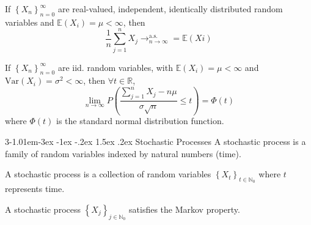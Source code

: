 \documentclass{tufte-handout}
\makeatletter
\renewcommand{\section}{\@startsection{section}%
    {3}{-1.01em}{-3ex \@plus -1ex \@minus -.2ex}%
    {1.5ex \@plus .2ex}
    {\hspace*{-5.5em}\fcolorbox{blue}{blue}{\parbox[c][1.0ex][b]{4em}{\phantom{space}}}
    \normalfont\Large\itshape\color{blue}}}
\makeatother
\begin{document}
\begin{Definition}
    
\end{Definition}


\begin{Theorem}
    If \( \left\{X_n\right\}_{n=0}^{\infty} \) are real-valued,
    independent, identically distributed random variables and
    \(\mathbb{E}(X_i) = \mu < \infty\), then
    \[\frac{1}{n} \sum_{j=1}^{n}X_j\rightarrow^{\text{a.s.}}_{n\rightarrow\infty}=\mathbb{E}(Xi)\]
\end{Theorem}



\begin{Theorem}
    If \( \left\{X_n\right\}_{n=0}^{\infty} \) are iid. random variables,
    with \(\mathbb{E}(X_i) = \mu < \infty\) and \(\text{Var}(X_i) = \sigma^2 < \infty\),
    then \( \forall t \in \mathbb{R} \),
    \[\lim_{n\rightarrow\infty}P\left(\frac{\sum_{j=1}^{n}X_j - n\mu}{\sigma\sqrt{n}}\leq t\right) = \Phi(t)\]
    where \(\Phi(t)\) is the standard normal distribution function.
\end{Theorem}

\section{Stochastic Processes}
A stochastic process is a family of random variables indexed by natural numbers (time).

\begin{Definition}
    A stochastic process is a collection of random variables
    \(\left\{X_t\right\}_{t\in \mathbb{N}_0}\) where \(t\) represents time.
\end{Definition}


\begin{Definition}
    A stochastic process \(\left\{X_j\right\}_{j\in \mathbb{N}_0}\)
    satisfies the Markov property.
\end{Definition}


\makeatletter
  \renewcommand{\section}{\@startsection{section}%
    {3}{0.8em}{-3ex \@plus -1ex \@minus -.2ex}%
    {1.5ex \@plus .2ex}
    {\hspace*{-5.5em}\fcolorbox{Periwinkle}{Periwinkle}{\parbox[c][1.0ex][b]{4em}{\phantom{space}}}
    \normalfont\Large\itshape\color{blue}}}
\makeatother



\end{document}
